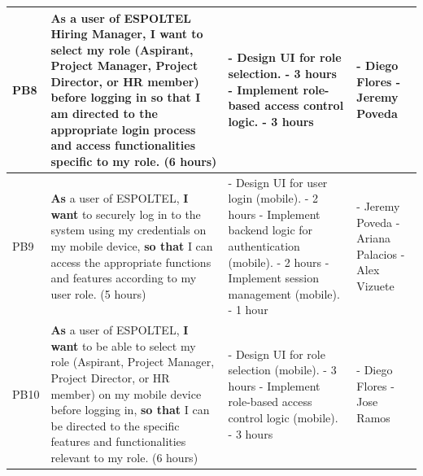 \documentclass{scrreprt}
\begin{document}
\begin{longtable}{|p{1.5cm}|p{5.5cm}|p{4.5cm}|p{3cm}|}
PB8 & \textbf{As} a user of ESPOLTEL Hiring Manager, \textbf{I want} to select my role (Aspirant, Project Manager, Project Director, or HR member) before logging in \textbf{so that} I am directed to the appropriate login process and access functionalities specific to my role. (6 hours) & 
- Design UI for role selection. - 3 hours \newline
- Implement role-based access control logic. - 3 hours
&
- Diego Flores \newline
- Jeremy Poveda
\\ \hline
PB9 & \textbf{As} a user of ESPOLTEL, \textbf{I want} to securely log in to the system using my credentials on my mobile device, \textbf{so that} I can access the appropriate functions and features according to my user role. (5 hours) &
- Design UI for user login (mobile). - 2 hours \newline
- Implement backend logic for authentication (mobile). - 2 hours \newline
- Implement session management (mobile). - 1 hour
&
- Jeremy Poveda \newline
- Ariana Palacios \newline
- Alex Vizuete
\\ \hline

PB10 & \textbf{As} a user of ESPOLTEL, \textbf{I want} to be able to select my role (Aspirant, Project Manager, Project Director, or HR member) on my mobile device before logging in, \textbf{so that} I can be directed to the specific features and functionalities relevant to my role. (6 hours) & 
- Design UI for role selection (mobile). - 3 hours \newline
- Implement role-based access control logic (mobile). - 3 hours
&
- Diego Flores \newline
- Jose Ramos
\\ \hline


\end{longtable}
\end{document}
